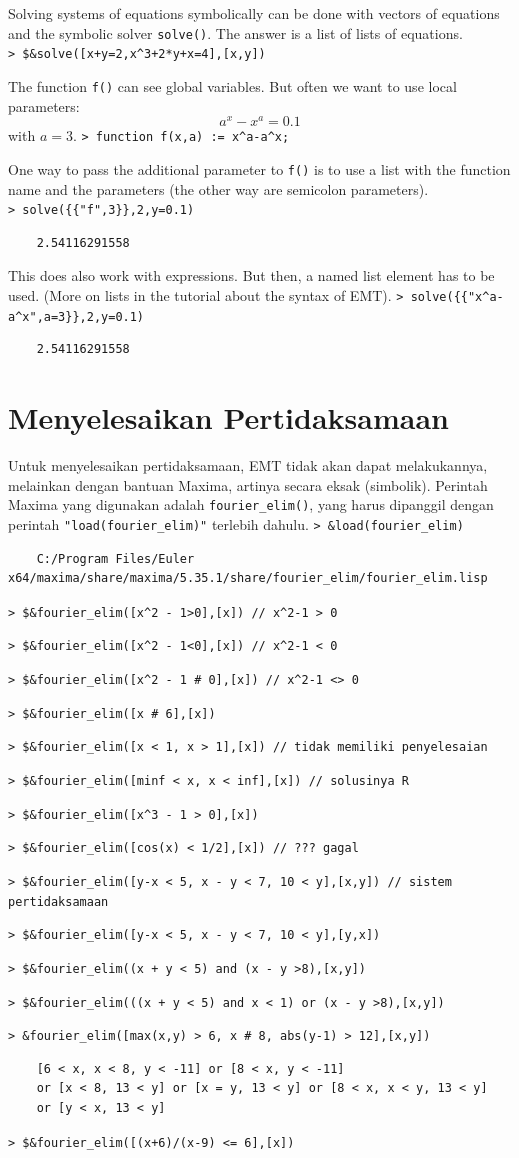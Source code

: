 \documentclass[11pt, a4paper]{article}
\newcommand{\emtcmd}[1]{\noindent\texttt{\textcolor{emtcommand}{>}\ #1}\par\smallskip}
\begin{document}
Solving systems of equations symbolically can be done with vectors of equations and the symbolic solver \texttt{solve()}. The answer is a list of lists of equations.
\emtcmd{\$\&solve([x+y=2,x\^{}3+2*y+x=4],[x,y])}

The function \texttt{f()} can see global variables. But often we want to use local parameters:
$$a^x-x^a = 0.1$$
with $a=3$.
\emtcmd{function f(x,a) := x\^{}a-a\^{}x;}

One way to pass the additional parameter to \texttt{f()} is to use a list with the function name and the parameters (the other way are semicolon parameters).
\emtcmd{solve(\{\{"f",3\}\},2,y=0.1)}
\begin{verbatim}
    2.54116291558
\end{verbatim}

This does also work with expressions. But then, a named list element has to be used. (More on lists in the tutorial about the syntax of EMT).
\emtcmd{solve(\{\{"x\^{}a-a\^{}x",a=3\}\},2,y=0.1)}
\begin{verbatim}
    2.54116291558
\end{verbatim}

\section*{Menyelesaikan Pertidaksamaan}

Untuk menyelesaikan pertidaksamaan, EMT tidak akan dapat melakukannya, melainkan dengan bantuan Maxima, artinya secara eksak (simbolik). Perintah Maxima yang digunakan adalah \texttt{fourier\_elim()}, yang harus dipanggil dengan perintah \texttt{"load(fourier\_elim)"} terlebih dahulu.
\emtcmd{\&load(fourier\_elim)}
\begin{verbatim}
    C:/Program Files/Euler x64/maxima/share/maxima/5.35.1/share/fourier_elim/fourier_elim.lisp
\end{verbatim}
\emtcmd{\$\&fourier\_elim([x\^{}2 - 1>0],[x]) \textcolor{emtcomment}{// x\^{}2-1 > 0}}
\emtcmd{\$\&fourier\_elim([x\^{}2 - 1<0],[x]) \textcolor{emtcomment}{// x\^{}2-1 < 0}}
\emtcmd{\$\&fourier\_elim([x\^{}2 - 1 \# 0],[x]) \textcolor{emtcomment}{// x\^{}2-1 <> 0}}
\emtcmd{\$\&fourier\_elim([x \# 6],[x])}
\emtcmd{\$\&fourier\_elim([x < 1, x > 1],[x]) \textcolor{emtcomment}{// tidak memiliki penyelesaian}}
\emtcmd{\$\&fourier\_elim([minf < x, x < inf],[x]) \textcolor{emtcomment}{// solusinya R}}
\emtcmd{\$\&fourier\_elim([x\^{}3 - 1 > 0],[x])}
\emtcmd{\$\&fourier\_elim([cos(x) < 1/2],[x]) \textcolor{emtcomment}{// ??? gagal}}
\emtcmd{\$\&fourier\_elim([y-x < 5, x - y < 7, 10 < y],[x,y]) \textcolor{emtcomment}{// sistem pertidaksamaan}}
\emtcmd{\$\&fourier\_elim([y-x < 5, x - y < 7, 10 < y],[y,x])}
\emtcmd{\$\&fourier\_elim((x + y < 5) and (x - y >8),[x,y])}
\emtcmd{\$\&fourier\_elim(((x + y < 5) and x < 1) or (x - y >8),[x,y])}
\emtcmd{\&fourier\_elim([max(x,y) > 6, x \# 8, abs(y-1) > 12],[x,y])}
\begin{verbatim}
    [6 < x, x < 8, y < -11] or [8 < x, y < -11]
    or [x < 8, 13 < y] or [x = y, 13 < y] or [8 < x, x < y, 13 < y]
    or [y < x, 13 < y]
\end{verbatim}
\emtcmd{\$\&fourier\_elim([(x+6)/(x-9) <= 6],[x])}
\end{document}
